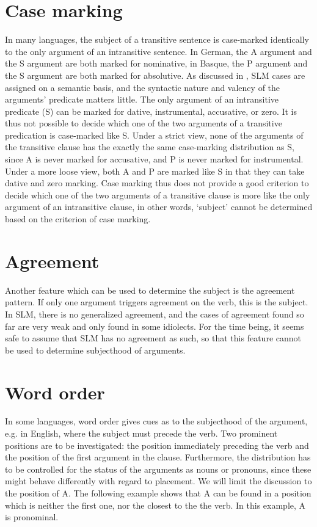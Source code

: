 \section{Case marking}\label{sec:grel:Casemarking}
In many languages, the subject of a transitive sentence is case-marked identically to the only argument of an intransitive sentence. In German, the A argument and the S argument are both marked for nominative, in Basque, the P argument and the S argument are both marked for absolutive. 
As discussed in , SLM cases are assigned on a semantic basis, and the syntactic nature and valency of the arguments' predicate matters little. The only argument of an intransitive predicate (S) can be marked for dative, instrumental, accusative, or zero. It is thus not possible to decide which one of the two arguments of a transitive predication is case-marked like S. Under a strict view, none of the arguments of the transitive clause has the exactly the same case-marking distribution as S, since A is never marked for accusative, and P is never marked for instrumental. Under a more loose view, both A and P are marked like S in that they can take dative and zero marking. Case marking thus does not provide a good criterion to decide which one of the two arguments of a transitive clause is more like the only argument of an intransitive clause, in other words, `subject' cannot be determined based on the criterion of case marking.

\section{Agreement}\label{sec:grel:Agreement}
Another feature which can be used to determine the subject is the agreement pattern. If only one argument triggers agreement on the verb, this is the subject. In SLM, there is no generalized agreement, and the cases of agreement found so far  are very weak and only found in some idiolects. For the time being, it seems safe to assume that SLM has no agreement as such, so that this feature cannot be used to determine subjecthood of arguments.

\section{Word order}\label{sec:grel:Wordorder}
In some languages, word order gives cues as to the subjecthood of the argument, e.g. in English, where the subject must precede the verb.  Two prominent positions are to be investigated: the position immediately preceding the verb and the position of the first argument in the clause. Furthermore, the distribution has to be controlled for the status of the arguments as nouns or pronouns, since these might behave differently with regard to placement. We will limit the discussion to the position of A. The following example shows that A can be found in a position which is neither the first one, nor the closest to the the verb. In this example, A is pronominal.

